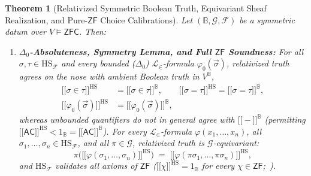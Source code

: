 \documentclass[10pt,twoside,openright]{book}
\providecommand{\llbracket}{\mathopen{[\![}}
\providecommand{\rrbracket}{\mathclose{]\!]}}
\theoremstyle{crmplain}
\newtheorem{theorem}{Theorem}[section]
\theoremstyle{crmdef}
\theoremstyle{crmremark}
\begin{document}
\begin{theorem}[Relativized Symmetric Boolean Truth, Equivariant Sheaf Realization, and Pure-$\mathsf{ZF}$ Choice Calibrations]\label{thm:symmetric-bv-zf}%
%
Let $(\mathbb{B}, \mathcal{G}, \mathcal{F})$ be a symmetric datum over $V \models \mathsf{ZFC}$. Then:
\begin{enumerate}[label=\textup{(\roman*)},leftmargin=2.0em]
  \item \textbf{$\Delta_0$-Absoluteness, Symmetry Lemma, and Full $\mathsf{ZF}$ Soundness:} For all $\sigma, \tau \in \mathrm{HS}_{\mathcal{F}}$ and every bounded ($\Delta_0$) $\mathcal{L}_\in$-formula $\varphi_0(\vec{\sigma})$, relativized truth agrees on the nose with ambient Boolean truth in $V^{\mathbb{B}}$,
  \[
    \begin{aligned}
      \llbracket \sigma \in \tau \rrbracket^{\mathrm{HS}} &= \llbracket \sigma \in \tau \rrbracket^{\mathbb{B}}, \qquad
      \llbracket \sigma = \tau \rrbracket^{\mathrm{HS}} = \llbracket \sigma = \tau \rrbracket^{\mathbb{B}}, \\
      \llbracket \varphi_0(\vec{\sigma}) \rrbracket^{\mathrm{HS}} &= \llbracket \varphi_0(\vec{\sigma}) \rrbracket^{\mathbb{B}},
    \end{aligned}
  \]
  whereas unbounded quantifiers do \emph{not} in general agree with $\llbracket - \rrbracket^{\mathbb{B}}$ (permitting $\llbracket \mathsf{AC} \rrbracket^{\mathrm{HS}} < 1_{\mathbb{B}} = \llbracket \mathsf{AC} \rrbracket^{\mathbb{B}}$). For every $\mathcal{L}_\in$-formula $\varphi(x_1, \dots, x_n)$, all $\sigma_1, \dots, \sigma_n \in \mathrm{HS}_{\mathcal{F}}$, and all $\pi \in \mathcal{G}$, relativized truth is $\mathcal{G}$-equivariant:
  \[
    \pi\bigl(\llbracket \varphi(\sigma_1, \dots, \sigma_n) \rrbracket^{\mathrm{HS}}\bigr) \;=\; \llbracket \varphi(\pi\sigma_1, \dots, \pi\sigma_n) \rrbracket^{\mathrm{HS}},
  \]
  and $\mathrm{HS}_{\mathcal{F}}$ validates all axioms of $\mathsf{ZF}$ ($\llbracket \chi \rrbracket^{\mathrm{HS}} = 1_{\mathbb{B}}$ for every $\chi \in \mathsf{ZF}$;~\cite[Thm.~5.14]{Jech73}).

\end{enumerate}
\end{theorem}
\end{document}
